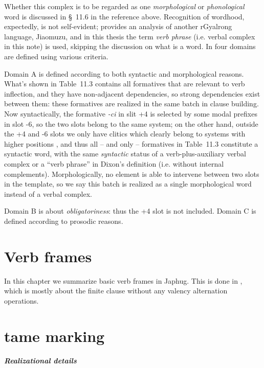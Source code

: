 \documentclass[a4paper, oneside, 12pt]{report}
\newcommand*{\citesec}[1]{\S~{#1}}
\newcommand*{\citetable}[1]{Table~{#1}}
\newcommand*{\citepage}[1]{p.~{#1}}
\newcommand*{\term}[1]{\emph{#1}}
\newcommand{\form}[1]{\emph{#1}}
\begin{document}
Whether this complex is to be regarded as one \emph{morphological} or \emph{phonological} word 
is discussed in \citesec{11.6}
in the reference above.
Recognition of wordhood, expectedly, is not self-evident;
\citet{prins2011web} provides an analysis of another rGyalrong language, Jiaomuzu, 
and in this thesis the term \term{verb phrase} 
(i.e. verbal complex in this note) is used,
skipping the discussion on what is a word.
In \citet[\citetable{11.3}]{jacques2021grammar}
four domains are defined using various criteria.

Domain A is defined according to both syntactic and morphological reasons.
What's shown in 
\citetable{11.3} contains all formatives that are relevant to verb inflection,
and they have non-adjacent dependencies,
so strong dependencies exist between them:
these formatives are realized in the same batch 
in clause building.
Now syntactically, the formative \form{-ci} in slit +4 
is selected by some modal prefixes in slot -6,
so the two slots belong to the same system;
on the other hand, outside the +4 and -6 slots 
we only have clitics which clearly belong to systems with higher positions
\citep[\citesec{11.6.2}]{jacques2021grammar},
and thus all -- and only -- formatives in \citetable{11.3}
constitute a syntactic word,
with the same \emph{syntactic} status of a verb-plus-auxiliary verbal complex or a
``verb phrase'' in Dixon's definition (i.e. without internal complements). 
Morphologically, no element is able to intervene 
between two slots in the template, 
so we say this batch is realized as a single morphological word 
instead of a verbal complex.

Domain B is about \emph{obligatoriness}:
thus the +4 slot is not included.
Domain C is defined according to prosodic reasons.

\chapter{Verb frames}

In this chapter we summarize basic verb frames in Japhug.
This is done in \citet[\citepage{14}]{jacques2021grammar},
which is mostly about the finite clause without any valency alternation operations.

\chapter{\acs{tame} marking}


\paragraph*{Realizational details}
\end{document}
